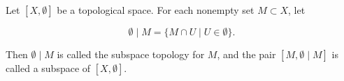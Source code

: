 Let $[X, \emptyset]$ be a topological space. For each nonempty set $M \subset X$, let

$$\emptyset \mid M = \{M \cap U \mid U \in \emptyset\}.$$

Then $\emptyset \mid M$ is called the subspace topology for $M$, and the pair $[M, \emptyset \mid M]$ is called a subspace of $[X, \emptyset]$.
